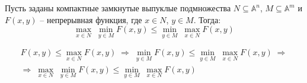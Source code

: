 \begin{propose}\label{cha:6/propose:2}
	Пусть заданы компактные замкнутые выпуклые подмножества $N \subseteq \mathbb{A}^n$, $M \subseteq \mathbb{A}^m$ и $F (x, y)$ – непрерывная функция, где $x \in N$, $y \in M$. Тогда:
	$$\underset{x \in N}{\max} \; \underset{y \in M}{\min} F(x,y) \le \underset{y \in M}{\min} \; \underset{x \in N}{\max} F(x, y)$$
\end{propose}
\begin{Proof}
	$$\begin{gathered}
		F(x,y) \le \underset{x \in N}{\max} F(x,y) \; \Rightarrow \; \underset{y \in M}{\min} F(x,y) \le \underset{y \in M}{\min} \; \underset{x \in N}{\max} F(x,y) \; \Rightarrow \\
		\Rightarrow \; \underset{x \in N}{\max} \; \underset{y \in M}{\min} F(x,y) \le \underset{y \in M}{\min} \; \underset{x \in N}{\max} F(x, y)
	\end{gathered}$$
\end{Proof}

